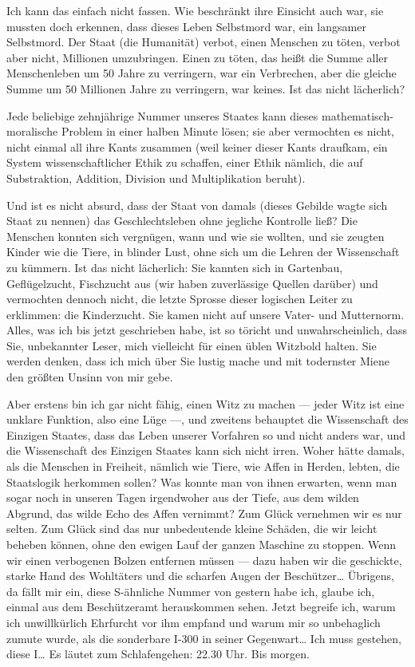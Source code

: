 Ich kann das einfach nicht fassen. Wie beschränkt ihre Einsicht
auch war, sie mussten doch erkennen, dass dieses Leben Selbstmord
war, ein langsamer Selbstmord. Der Staat (die Humanität) verbot,
einen Menschen zu töten, verbot aber nicht, Millionen umzubringen.
Einen zu töten, das heißt die Summe aller Menschenleben um 50 Jahre
zu verringern, war ein Verbrechen, aber die gleiche Summe um 50
Millionen Jahre zu verringern, war keines. Ist das nicht
lächerlich?

Jede beliebige zehnjährige Nummer unseres Staates kann dieses
mathematisch-moralische Problem in einer halben Minute lösen; sie
aber vermochten es nicht, nicht einmal all ihre Kants zusammen
(weil keiner dieser Kants draufkam, ein System wissenschaftlicher
Ethik zu schaffen, einer Ethik nämlich, die auf Substraktion,
Addition, Division und Multiplikation beruht).

Und ist es nicht absurd, dass der Staat von damals (dieses Gebilde
wagte sich Staat zu nennen) das Geschlechtsleben ohne jegliche
Kontrolle ließ? Die Menschen konnten sich vergnügen, wann und wie
sie wollten, und sie zeugten Kinder wie die Tiere, in blinder Lust,
ohne sich um die Lehren der Wissenschaft zu kümmern. Ist das nicht
lächerlich: Sie kannten sich in Gartenbau, Geflügelzucht,
Fischzucht aus (wir haben zuverlässige Quellen darüber) und
vermochten dennoch nicht, die letzte Sprosse dieser logischen
Leiter zu erklimmen: die Kinderzucht. Sie kamen nicht auf unsere
Vater- und Mutternorm. Alles, was ich bis jetzt geschrieben habe,
ist so töricht und unwahrscheinlich, dass Sie, unbekannter Leser,
mich vielleicht für einen üblen Witzbold halten. Sie werden denken,
dass ich mich über Sie lustig mache und mit todernster Miene den
größten Unsinn von mir gebe.

Aber erstens bin ich gar nicht fähig, einen Witz zu machen — jeder
Witz ist eine unklare Funktion, also eine Lüge —, und zweitens
behauptet die Wissenschaft des Einzigen Staates, dass das Leben
unserer Vorfahren so und nicht anders war, und die Wissenschaft des
Einzigen Staates kann sich nicht irren. Woher hätte damals, als
die Menschen in Freiheit, nämlich wie Tiere, wie Affen in Herden,
lebten, die Staatslogik herkommen sollen? Was konnte man von ihnen
erwarten, wenn man sogar noch in unseren Tagen irgendwoher aus der
Tiefe, aus dem wilden Abgrund, das wilde Echo des Affen vernimmt?
Zum Glück vernehmen wir es nur selten. Zum Glück sind das nur
unbedeutende kleine Schäden, die wir leicht beheben können, ohne
den ewigen Lauf der ganzen Maschine zu stoppen. Wenn wir einen
verbogenen Bolzen entfernen müssen — dazu haben wir die geschickte,
starke Hand des Wohltäters und die scharfen Augen der Beschützer\ldots{}
Übrigens, da fällt mir ein, diese S-ähnliche Nummer von gestern
habe ich, glaube ich, einmal aus dem Beschützeramt herauskommen
sehen. Jetzt begreife ich, warum ich unwillkürlich Ehrfurcht vor
ihm empfand und warum mir so unbehaglich zumute wurde, als die
sonderbare I-300 in seiner Gegenwart\ldots{} Ich muss gestehen, diese
I\ldots{} Es läutet zum Schlafengehen: 22.30 Uhr. Bis morgen.

